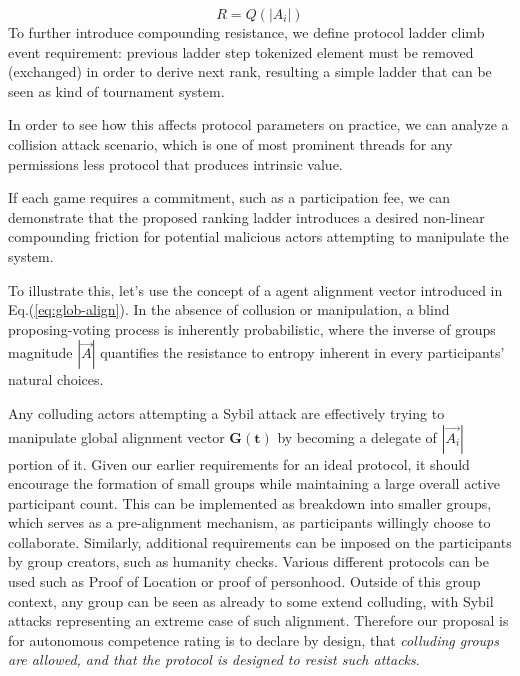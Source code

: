 \documentclass{article}
\begin{document}
\begin{CJK}{UTF8}{gbsn}
\begin{multicols}{2}
        \begin{equation}
            \label{eq:comp-quant}
            R = Q(|A_i|)
        \end{equation}
        To further introduce compounding resistance, we define protocol ladder climb event requirement: previous ladder step tokenized element must be removed (exchanged) in order to derive next rank, resulting a simple ladder that can be seen as kind of tournament system.


        In order to see how this affects protocol parameters on practice, we can analyze a collision attack scenario, which is one of most prominent threads for any permissions less protocol that produces intrinsic value.


        If each game requires a commitment, such as a participation fee, we can demonstrate that the proposed ranking ladder introduces a desired non-linear compounding friction for potential malicious actors attempting to manipulate the system.

        To illustrate this, let's use the concept of a agent alignment vector introduced in Eq.(\ref*{eq:glob-align}). In the absence of collusion or manipulation, a blind proposing-voting process is inherently probabilistic, where the inverse of groups magnitude $|\vec{A}|$ quantifies the resistance to entropy inherent in every participants' natural choices.


        Any colluding actors attempting a Sybil attack are effectively trying to manipulate global alignment vector $\mathbf{G(t)}$ by becoming a delegate of $|\vec{A_i}|$ portion of it. Given our earlier requirements for an ideal protocol, it should encourage the formation of small groups while maintaining a large overall active participant count. This can be implemented as breakdown into smaller groups, which serves as a pre-alignment mechanism, as participants willingly choose to collaborate. Similarly, additional requirements can be imposed on the participants by group creators, such as humanity checks. Various different protocols can be used such as Proof of Location\cite{sheng2024bftpolocbyzantinefortifiedtrigonometric} or  proof of personhood\cite{WorldCoin2024}. Outside of this group context, any group can be seen as already to some extend colluding, with Sybil attacks representing an extreme case of such alignment. Therefore our proposal is for autonomous competence rating is to declare by design, that \textit{colluding groups are allowed, and that the protocol is designed to resist such attacks}.


\end{multicols}
\end{CJK}
\end{document}
